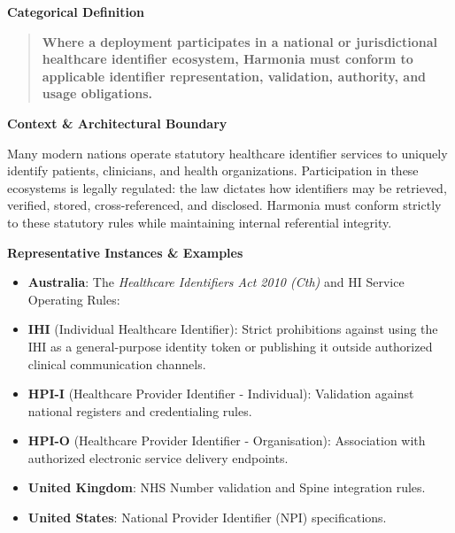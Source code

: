 \par\medskip\textbf{Categorical Definition}\par


\begin{quote}


\textbf{Where a deployment participates in a national or jurisdictional healthcare identifier ecosystem, Harmonia must conform to applicable identifier representation, validation, authority, and usage obligations.}



\end{quote}


\par\medskip\textbf{Context \& Architectural Boundary}\par


Many modern nations operate statutory healthcare identifier services to uniquely identify patients, clinicians, and health organizations. Participation in these ecosystems is legally regulated: the law dictates how identifiers may be retrieved, verified, stored, cross-referenced, and disclosed. Harmonia must conform strictly to these statutory rules while maintaining internal referential integrity.



\par\medskip\textbf{Representative Instances \& Examples}\par


\begin{itemize}


\item \textbf{Australia}: The \emph{Healthcare Identifiers Act 2010 (Cth)} and HI Service Operating Rules:

\item \textbf{IHI} (Individual Healthcare Identifier): Strict prohibitions against using the IHI as a general-purpose identity token or publishing it outside authorized clinical communication channels.

\item \textbf{HPI-I} (Healthcare Provider Identifier - Individual): Validation against national registers and credentialing rules.

\item \textbf{HPI-O} (Healthcare Provider Identifier - Organisation): Association with authorized electronic service delivery endpoints.

\item \textbf{United Kingdom}: NHS Number validation and Spine integration rules.

\item \textbf{United States}: National Provider Identifier (NPI) specifications.

\end{itemize}


